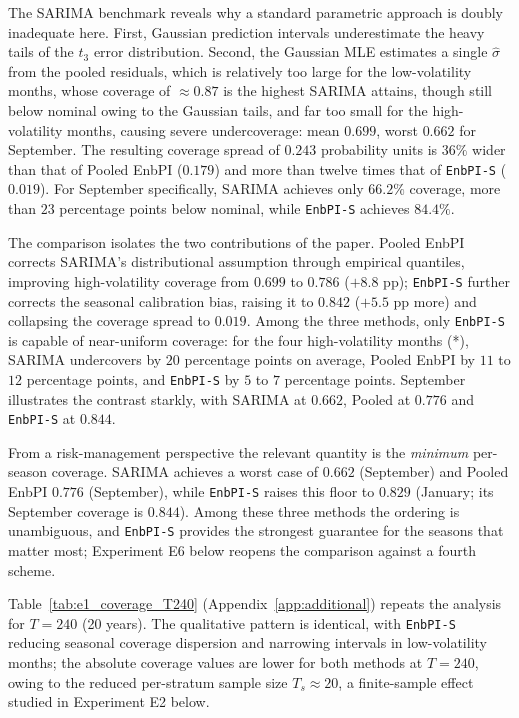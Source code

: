 The SARIMA benchmark reveals why a standard parametric approach is
doubly inadequate here.  First, Gaussian prediction intervals
underestimate the heavy tails of the $t_3$ error distribution.
Second, the Gaussian MLE estimates a single $\hat{\sigma}$ from the
pooled residuals, which is relatively too large for the
low-volatility months, whose coverage of $\approx 0.87$ is the
highest SARIMA attains, though still below nominal owing to the
Gaussian tails, and far too small for the high-volatility months,
causing severe undercoverage: mean $0.699$, worst $0.662$ for
September.  The resulting coverage spread of $0.243$ probability
units is $36\%$ wider than that of Pooled EnbPI ($0.179$) and more
than twelve times that of \texttt{EnbPI-S} ($0.019$).  For September
specifically, SARIMA achieves only $66.2\%$ coverage, more than $23$
percentage points below nominal, while \texttt{EnbPI-S} achieves
$84.4\%$.

The comparison isolates the two contributions of the paper.  Pooled
EnbPI corrects SARIMA's distributional assumption through empirical
quantiles, improving high-volatility coverage from $0.699$ to
$0.786$ ($+8.8$ pp); \texttt{EnbPI-S} further corrects the seasonal
calibration bias, raising it to $0.842$ ($+5.5$ pp more) and
collapsing the coverage spread to $0.019$.  Among the three methods,
only \texttt{EnbPI-S} is capable of near-uniform coverage: for the
four high-volatility months (*), SARIMA undercovers by $20$
percentage points on average, Pooled EnbPI by $11$ to $12$
percentage points, and \texttt{EnbPI-S} by $5$ to $7$
percentage points.  September illustrates the contrast starkly, with
SARIMA at $0.662$, Pooled at $0.776$ and \texttt{EnbPI-S} at $0.844$.

From a risk-management perspective the relevant quantity is the
\emph{minimum} per-season coverage.  SARIMA achieves a worst case of
$0.662$ (September) and Pooled EnbPI $0.776$ (September), while
\texttt{EnbPI-S} raises this floor to $0.829$ (January; its September
coverage is $0.844$).  Among these three methods the ordering is
unambiguous, and \texttt{EnbPI-S} provides the strongest guarantee
for the seasons that matter most; Experiment E6 below reopens the
comparison against a fourth scheme.

Table~\ref{tab:e1_coverage_T240} (Appendix~\ref{app:additional})
repeats the analysis for $T = 240$ (20 years).  The qualitative
pattern is identical, with \texttt{EnbPI-S} reducing seasonal
coverage dispersion and narrowing intervals in low-volatility months;
the absolute coverage values are lower for both methods at $T = 240$,
owing to the reduced per-stratum sample size $T_s \approx 20$, a
finite-sample effect studied in Experiment E2 below.

